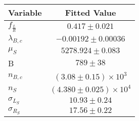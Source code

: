 \begin{tabular}[t]{lc}
\hline
Variable &Fitted Value\\
\hline\hline
$f_{\frac{L}{R}}$&$0.417\pm0.021$\\
\hline
$\lambda_{B,c}$&$-0.00192\pm0.00036$\\
\hline
$\mu_S$&$5278.924\pm0.083$\\
\hline
B&$789\pm38$\\
\hline
$n_{B,c}$&$(3.08\pm0.15)\times 10^3$\\
\hline
$n_S$&$(4.380\pm0.025)\times 10^4$\\
\hline
$\sigma_{L_S}$&$10.93\pm0.24$\\
\hline
$\sigma_{R_S}$&$17.56\pm0.22$\\
\hline
\end{tabular}
